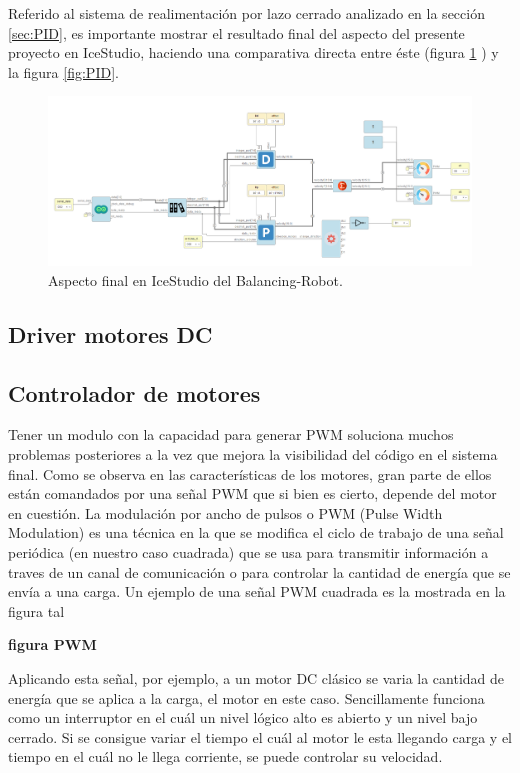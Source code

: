 Referido al sistema de realimentación por lazo cerrado analizado en la sección \ref{sec:PID}, es importante mostrar el resultado final del aspecto del presente proyecto en IceStudio, haciendo una comparativa directa entre éste (figura \ref{fig:finalIceStudio} ) y la figura \ref{fig:PID}.
\newpage
\begin{figure}[H]
	\center
	\includegraphics[scale=0.6, angle=90]{imagenes/Balancing_robot/finalIceStudio}
	\caption{Aspecto final en IceStudio del Balancing-Robot.}
	\label{fig:finalIceStudio}
\end{figure}

\subsection{Driver motores DC} \label{sec:driver_motores}

\subsection{Controlador de motores}
Tener un modulo con la capacidad para generar PWM soluciona muchos problemas posteriores a la vez que mejora la visibilidad del código en el sistema final. Como se observa en las características de los motores, gran parte de ellos están comandados por una señal PWM que si bien es cierto, depende del motor en cuestión. \newline
La modulación por ancho de pulsos o PWM (Pulse Width Modulation) es una técnica en la que se modifica el ciclo de trabajo de una señal periódica (en nuestro caso cuadrada) que se usa para transmitir información a traves de un canal de comunicación o para controlar la cantidad de energía que se envía a una carga. Un ejemplo de una señal PWM cuadrada es la mostrada en la figura tal 

\textbf{figura PWM}

Aplicando esta señal, por ejemplo, a un motor DC clásico se varia la cantidad de energía que se aplica a la carga, el motor en este caso. Sencillamente funciona como un interruptor en el cuál un nivel lógico alto es abierto y un nivel bajo cerrado. Si se consigue variar el tiempo el cuál al motor le esta llegando carga y el tiempo en el cuál no le llega corriente, se puede controlar su velocidad. \newline

